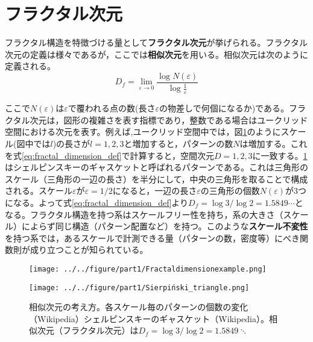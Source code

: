 \documentclass[autodetect-engine,dvi=dvipdfmx,a4paper,ja=standard,oneside,openany,11pt,draft]{bxjsbook}
\begin{document}
\section{フラクタル次元}
フラクタル構造を特徴づける量として\textbf{フラクタル次元}が挙げられる。フラクタル次元の定義は様々であるが，ここでは\textbf{相似次元}を用いる。相似次元は次のように定義される。
\begin{equation}
  D_f=\lim_{\varepsilon \to 0}\frac{\log N(\varepsilon)}{\log \frac{1}{\varepsilon}}
  \label{eq:fractal_dimension_def}
\end{equation}

ここで$N(\varepsilon)$は$\varepsilon$で覆われる点の数(長さ$\varepsilon$の物差しで何個になるか)である。フラクタル次元は，図形の複雑さを表す指標であり，整数である場合はユークリッド空間における次元を表す。例えば,ユークリッド空間中では，図\ref{fig:fractal_stracture}のようにスケール(図中では$l$)の長さが$l=1,2,3$と増加すると，パターンの数$N$は増加する。これを式\ref{eq:fractal_dimension_def}で計算すると，空間次元$D=1,2,3$に一致する。\ref{fig:fractal_stracture}はシェルピンスキーのギャスケットと呼ばれるパターンである。これは三角形のスケール（三角形の一辺の長さ）を半分にして，中央の三角形を取ることで構成される。スケール$\varepsilon$が$\varepsilon=1/2$になると，一辺の長さ$\varepsilon$の三角形の個数$N(\varepsilon)$が3つになる。よって式\ref{eq:fractal_dimension_def}より$D_f=\log 3/\log 2=1.5849\cdots$となる。フラクタル構造を持つ系はスケールフリー性を持ち，系の大きさ（スケール）によらず同じ構造（パターン配置など）を持つ。このような\textbf{スケール不変性}を持つ系では，あるスケールで計測できる量（パターンの数，密度等）にべき関数則が成り立つことが知られている。

\begin{figure}[htbp]
  \begin{minipage}{0.45\textwidth}
    \centering
    \subcaption{}
    \texttt{[image: ../../figure/part1/Fractaldimensionexample.png]}
    \label{fig:相似次元の考え方}
  \end{minipage}
  \begin{minipage}{0.45\textwidth}
    \centering
    \subcaption{}
    \texttt{[image: ../../figure/part1/Sierpiński\_triangle.png]}
    \label{fig:シェルピンスキーのギャスケット}
  \end{minipage}
  \caption{相似次元の考え方。各スケール毎のパターンの個数の変化（Wikipedia）シェルピンスキーのギャスケット（Wikipedia）。相似次元（フラクタル次元）は$D_f=\log 3/\log 2=1.5849\ddots$}
  \label{fig:fractal_stracture}
\end{figure}
\end{document}
